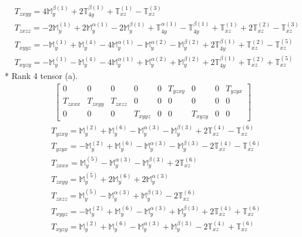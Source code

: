 \documentclass[fleqn,8pt,landscape]{jsarticle}
\begin{document}
\begin{align*}
& T_{zxyy} = 4 \mathbb{M}_{y}^{\beta(1)} + 2 \mathbb{T}_{4y}^{\beta(1)} + \mathbb{T}_{xz}^{(1)} - \mathbb{T}_{xz}^{(3)} \\
& T_{zxzz} = - 2 \mathbb{M}_{y}^{(1)} + 2 \mathbb{M}_{y}^{\alpha(1)} - 2 \mathbb{M}_{y}^{\beta(1)} + \mathbb{T}_{4y}^{\alpha(1)} - \mathbb{T}_{4y}^{\beta(1)} + \mathbb{T}_{xz}^{(1)} + 2 \mathbb{T}_{xz}^{(2)} - \mathbb{T}_{xz}^{(3)} \\
& T_{xyyz} = - \mathbb{M}_{y}^{(1)} + \mathbb{M}_{y}^{(4)} - 4 \mathbb{M}_{y}^{\alpha(1)} - \mathbb{M}_{y}^{\alpha(2)} - \mathbb{M}_{y}^{\beta(2)} + 2 \mathbb{T}_{4y}^{\beta(1)} + \mathbb{T}_{xz}^{(2)} - \mathbb{T}_{xz}^{(5)} \\
& T_{xyzy} = - \mathbb{M}_{y}^{(1)} - \mathbb{M}_{y}^{(4)} - 4 \mathbb{M}_{y}^{\alpha(1)} + \mathbb{M}_{y}^{\alpha(2)} + \mathbb{M}_{y}^{\beta(2)} + 2 \mathbb{T}_{4y}^{\beta(1)} + \mathbb{T}_{xz}^{(2)} + \mathbb{T}_{xz}^{(5)}
\end{align*}
* Rank 4 tensor (a).
\begin{align*}
\begin{bmatrix} 0 & 0 & 0 & 0 & 0 & T_{yzxy} & 0 & 0 & T_{yzyx} \\ T_{zxxx} & T_{zxyy} & T_{zxzz} & 0 & 0 & 0 & 0 & 0 & 0 \\ 0 & 0 & 0 & T_{xyyz} & 0 & 0 & T_{xyzy} & 0 & 0 \end{bmatrix}
\end{align*}
\begin{align*}
& T_{yzxy} = \mathbb{M}_{y}^{(2)} + \mathbb{M}_{y}^{(6)} - \mathbb{M}_{y}^{\alpha(3)} - \mathbb{M}_{y}^{\beta(3)} + 2 \mathbb{T}_{xz}^{(4)} - \mathbb{T}_{xz}^{(6)} \\
& T_{yzyx} = - \mathbb{M}_{y}^{(2)} + \mathbb{M}_{y}^{(6)} - \mathbb{M}_{y}^{\alpha(3)} - \mathbb{M}_{y}^{\beta(3)} - 2 \mathbb{T}_{xz}^{(4)} - \mathbb{T}_{xz}^{(6)} \\
& T_{zxxx} = \mathbb{M}_{y}^{(5)} - \mathbb{M}_{y}^{\alpha(3)} - \mathbb{M}_{y}^{\beta(3)} + 2 \mathbb{T}_{xz}^{(6)} \\
& T_{zxyy} = \mathbb{M}_{y}^{(5)} + 2 \mathbb{M}_{y}^{(6)} + 2 \mathbb{M}_{y}^{\alpha(3)} \\
& T_{zxzz} = \mathbb{M}_{y}^{(5)} - \mathbb{M}_{y}^{\alpha(3)} + \mathbb{M}_{y}^{\beta(3)} - 2 \mathbb{T}_{xz}^{(6)} \\
& T_{xyyz} = - \mathbb{M}_{y}^{(2)} + \mathbb{M}_{y}^{(6)} - \mathbb{M}_{y}^{\alpha(3)} + \mathbb{M}_{y}^{\beta(3)} + 2 \mathbb{T}_{xz}^{(4)} + \mathbb{T}_{xz}^{(6)} \\
& T_{xyzy} = \mathbb{M}_{y}^{(2)} + \mathbb{M}_{y}^{(6)} - \mathbb{M}_{y}^{\alpha(3)} + \mathbb{M}_{y}^{\beta(3)} - 2 \mathbb{T}_{xz}^{(4)} + \mathbb{T}_{xz}^{(6)}
\end{align*}
\end{document}

